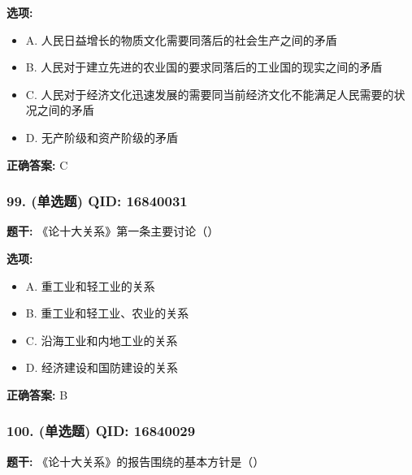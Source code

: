 \documentclass[12pt,UTF8]{ctexart}
\begin{document}
\textbf{选项:}
\begin{itemize}[leftmargin=*]

  \item A. 人民日益增长的物质文化需要同落后的社会生产之间的矛盾

  \item B. 人民对于建立先进的农业国的要求同落后的工业国的现实之间的矛盾

  \item C. 人民对于经济文化迅速发展的需要同当前经济文化不能满足人民需要的状况之间的矛盾

  \item D. 无产阶级和资产阶级的矛盾

\end{itemize}

\textbf{正确答案:}
C

\vspace{0.3em}\hrulefill\vspace{0.7em}

\subsubsection*{99. (单选题) \small QID: 16840031}

\textbf{题干:}
《论十大关系》第一条主要讨论（）

\textbf{选项:}
\begin{itemize}[leftmargin=*]

  \item A. 重工业和轻工业的关系

  \item B. 重工业和轻工业、农业的关系

  \item C. 沿海工业和内地工业的关系

  \item D. 经济建设和国防建设的关系

\end{itemize}

\textbf{正确答案:}
B

\vspace{0.3em}\hrulefill\vspace{0.7em}

\subsubsection*{100. (单选题) \small QID: 16840029}

\textbf{题干:}
《论十大关系》的报告围绕的基本方针是（）
\end{document}
